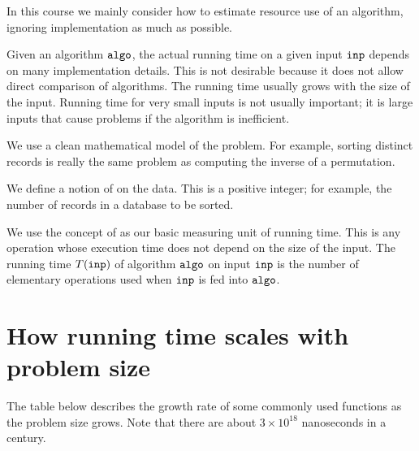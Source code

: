 In this course we mainly consider how to estimate resource use of an algorithm, 
ignoring implementation as much as possible.  

Given an algorithm $\operatorname{\text{\texttt{algo}}}$, the actual running time on a given
input $\operatorname{\text{\texttt{inp}}}$ depends on many implementation details. This is not desirable
because it does not allow direct comparison of algorithms. 
The running time usually grows with the size of the input.
Running time for very small inputs is not usually important; it is large
inputs that cause problems if the algorithm is inefficient. 

We use a clean mathematical model of the problem. 
For example, sorting distinct records is really the same problem as computing the inverse of a permutation. 

\begin{Definition}
We define a notion of  on the data. 
This is a positive integer; for example, the number of records in a database to be sorted.

We use the concept of  as our basic measuring unit of running time. 
This is any operation whose execution time does not depend on the size of the input.
The running time $T(\operatorname{\text{\texttt{inp}}})$ of algorithm $\operatorname{\text{\texttt{algo}}}$ on input $\operatorname{\text{\texttt{inp}}}$ is the 
number of elementary operations used when $\operatorname{\text{\texttt{inp}}}$ is fed into $\operatorname{\text{\texttt{algo}}}$.
\end{Definition}

\pagebreak[4]
\section{How running time scales with problem size}
The table below describes the growth rate of some commonly used functions as the problem size grows.
Note that there are about $3 \times 10^{18}$ nanoseconds in a century.

